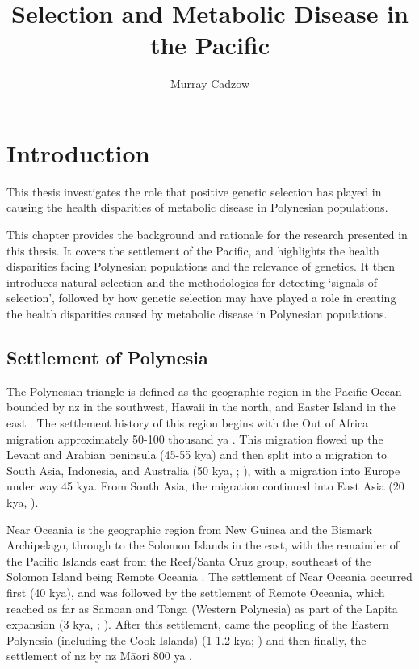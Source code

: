 \documentclass[twoside,openright]{report}
\title{Selection and Metabolic Disease in the Pacific}
\author{Murray Cadzow}
\date{}
\newcommand{\tex}[1]{#1}
\begin{document}
\maketitle

\newpage\null\thispagestyle{empty}\newpage


\address{710 Cumberland St, Dunedin, NZ}

\frontstuff

\chapter{Introduction}\label{introduction}

\glsresetall

This thesis investigates the role that positive genetic selection has
played in causing the health disparities of metabolic disease in
Polynesian populations.

This chapter provides the background and rationale for the research
presented in this thesis. It covers the settlement of the Pacific, and
highlights the health disparities facing Polynesian populations and the
relevance of genetics. It then introduces natural selection and the
methodologies for detecting `signals of selection', followed by how
genetic selection may have played a role in creating the health
disparities caused by metabolic disease in Polynesian populations.

\section{Settlement of Polynesia}\label{settlement-of-polynesia}

The Polynesian triangle is defined as the geographic region in the
Pacific Ocean bounded by \Gls{nz} in the southwest, Hawaii in the north,
and Easter Island in the east \citep{Barcham2009}. The settlement
history of this region begins with the Out of Africa migration
approximately 50-100 thousand \gls{ya} \citep{Nielsen2017}. This
migration flowed up the Levant and Arabian peninsula (45-55 k\gls{ya})
and then split into a migration to South Asia, Indonesia, and Australia
(50 k\gls{ya}, \citet{Kivisild1999}; \citet{Quintana-Murci1999}), with a
migration into Europe under way 45 k\gls{ya}. From South Asia, the
migration continued into East Asia (20 k\gls{ya}, \citet{Groucutt2015}).

Near Oceania is the geographic region from New Guinea and the Bismark
Archipelago, through to the Solomon Islands in the east, with the
remainder of the Pacific Islands east from the Reef/Santa Cruz group,
southeast of the Solomon Island being Remote Oceania
\citep{Matisoo-Smith2018}. The settlement of Near Oceania occurred first
(40 k\gls{ya}), and was followed by the settlement of Remote Oceania,
which reached as far as Samoan and Tonga (Western Polynesia) as part of
the Lapita expansion (3 k\gls{ya}, \citet{Matisoo-Smith2015};
\citet{Skoglund2016}). After this settlement, came the peopling of the
Eastern Polynesia (including the Cook Islands) (1-1.2 k\gls{ya};
\citet{Wilmshurst2011}) and then finally, the settlement of \glsdesc{nz}
by \gls{nz} M\tex{\={a}}ori 800 \gls{ya}
\citep{Duggan2014, Matisoo-Smith2015}.
\end{document}
